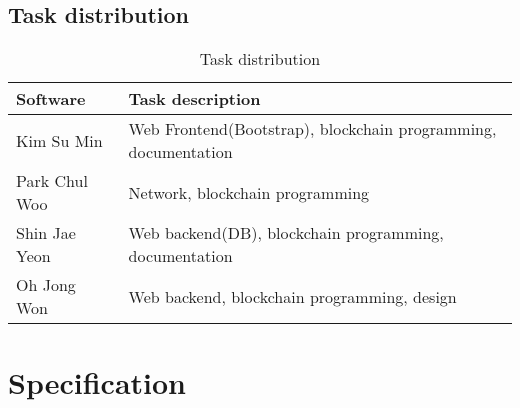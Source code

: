 \documentclass[conference]{IEEEtran}
\begin{document}
\subsection{Task distribution}
  \begin{table}[htbp]
  \renewcommand{\arraystretch}{1.5}
\caption{Task distribution}
\begin{center}
\begin{tabular}{|p{3cm}|p{4.7cm}|}
\hline
\textbf{Software} & \textbf{Task description} \\
\hline
Kim Su Min & Web Frontend(Bootstrap), blockchain programming, documentation \\
\hline
Park Chul Woo & Network, blockchain programming \\
\hline
Shin Jae Yeon&Web backend(DB), blockchain programming, documentation \\
\hline
Oh Jong Won  & Web backend, blockchain programming, design \\
\hline
\end{tabular}
\label{tab1}
\end{center}
\end{table}

\section{Specification}
\end{document}
